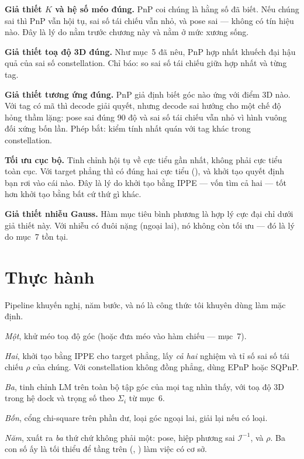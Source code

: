 \documentclass[../../marker.tex]{subfiles}
\begin{document}
\textbf{Giả thiết \(K\) và hệ số méo đúng.} PnP coi chúng là hằng số đã biết. Nếu chúng sai thì PnP vẫn hội tụ, sai số tái chiếu vẫn nhỏ, và pose sai --- không có tín hiệu nào. Đây là lý do  nằm trước chương này và  nằm ở mức xương sống.

\textbf{Giả thiết toạ độ 3D đúng.} Như mục~5 đã nêu, PnP hợp nhất khuếch đại hậu quả của sai số constellation. Chỉ báo: so sai số tái chiếu giữa hợp nhất và từng tag.

\textbf{Giả thiết tương ứng đúng.} PnP giả định biết góc nào ứng với điểm 3D nào. Với tag có mã thì decode giải quyết, nhưng decode sai hướng cho một chế độ hỏng thầm lặng: pose sai đúng 90 độ và sai số tái chiếu vẫn nhỏ vì hình vuông đối xứng bốn lần. Phép bắt: kiểm tính nhất quán với tag khác trong constellation.

\textbf{Tối ưu cục bộ.} Tinh chỉnh hội tụ về cực tiểu gần nhất, không phải cực tiểu toàn cục. Với target phẳng thì có đúng hai cực tiểu (), và khởi tạo quyết định bạn rơi vào cái nào. Đây là lý do khởi tạo bằng IPPE --- vốn tìm cả hai --- tốt hơn khởi tạo bằng bất cứ thứ gì khác.

\textbf{Giả thiết nhiễu Gauss.} Hàm mục tiêu bình phương là hợp lý cực đại chỉ dưới giả thiết này. Với nhiễu có đuôi nặng (ngoại lai), nó không còn tối ưu --- đó là lý do mục~7 tồn tại.

\section{Thực hành}

Pipeline khuyến nghị, năm bước, và nó là công thức tôi khuyên dùng làm mặc định.

\emph{Một}, khử méo toạ độ góc (hoặc đưa méo vào hàm chiếu ---  mục~7).

\emph{Hai}, khởi tạo bằng IPPE cho target phẳng, lấy \emph{cả hai} nghiệm và tỉ số sai số tái chiếu \(\rho\) của chúng. Với constellation không đồng phẳng, dùng EPnP hoặc SQPnP.

\emph{Ba}, tinh chỉnh LM trên toàn bộ tập góc của mọi tag nhìn thấy, với toạ độ 3D trong hệ dock và trọng số theo \(\Sigma_i\) từ mục~6.

\emph{Bốn}, cổng chi-square trên phần dư, loại góc ngoại lai, giải lại nếu có loại.

\emph{Năm}, xuất ra \emph{ba} thứ chứ không phải một: pose, hiệp phương sai \(\mathcal{I}^{-1}\), và \(\rho\). Ba con số ấy là tối thiểu để tầng trên (, ) làm việc có cơ sở.
\end{document}
